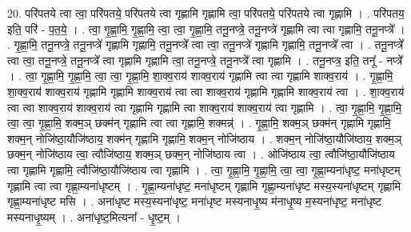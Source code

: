 \documentclass[17pt]{extarticle}
\begin{document}
20. परि॑पतये त्वा त्वा॒ परि॑पतये॒ परि॑पतये त्वा गृह्णामि गृह्णामि त्वा॒ परि॑पतये॒ परि॑पतये त्वा गृह्णामि । . परि॑पतय॒ इति॒ परि॑ - प॒त॒ये॒ । . त्वा॒ गृ॒ह्णा॒मि॒ गृ॒ह्णा॒मि॒ त्वा॒ त्वा॒ गृ॒ह्णा॒मि॒ तनू॒नप्त्रे॒ तनू॒नप्त्रे॑ गृह्णामि त्वा त्वा गृह्णामि॒ तनू॒नप्त्रे᳚ । . गृ॒ह्णा॒मि॒ तनू॒नप्त्रे॒ तनू॒नप्त्रे॑ गृह्णामि गृह्णामि॒ तनू॒नप्त्रे᳚ त्वा त्वा॒ तनू॒नप्त्रे॑ गृह्णामि गृह्णामि॒ तनू॒नप्त्रे᳚ त्वा । . तनू॒नप्त्रे᳚ त्वा त्वा॒ तनू॒नप्त्रे॒ तनू॒नप्त्रे᳚ त्वा गृह्णामि गृह्णामि त्वा॒ तनू॒नप्त्रे॒ तनू॒नप्त्रे᳚ त्वा गृह्णामि । . तनू॒नप्त्र॒ इति॒ तनू᳚ - नप्त्रे᳚ । . त्वा॒ गृ॒ह्णा॒मि॒ गृ॒ह्णा॒मि॒ त्वा॒ त्वा॒ गृ॒ह्णा॒मि॒ शा॒क्व॒राय॑ शाक्व॒राय॑ गृह्णामि त्वा त्वा गृह्णामि शाक्व॒राय॑ । . गृ॒ह्णा॒मि॒ शा॒क्व॒राय॑ शाक्व॒राय॑ गृह्णामि गृह्णामि शाक्व॒राय॑ त्वा त्वा शाक्व॒राय॑ गृह्णामि गृह्णामि शाक्व॒राय॑ त्वा । . शा॒क्व॒राय॑ त्वा त्वा शाक्व॒राय॑ शाक्व॒राय॑ त्वा गृह्णामि गृह्णामि त्वा शाक्व॒राय॑ शाक्व॒राय॑ त्वा गृह्णामि । . त्वा॒ गृ॒ह्णा॒मि॒ गृ॒ह्णा॒मि॒ त्वा॒ त्वा॒ गृ॒ह्णा॒मि॒ शक्म॒ञ् छक्म॑न् गृह्णामि त्वा त्वा गृह्णामि॒ शक्मन्न्॑ । . गृ॒ह्णा॒मि॒ शक्म॒ञ् छक्म॑न् गृह्णामि गृह्णामि॒ शक्म॒न् नोजि॑ष्ठा॒यौजि॑ष्ठाय॒ शक्म॑न् गृह्णामि गृह्णामि॒ शक्म॒न् नोजि॑ष्ठाय । . शक्म॒न् नोजि॑ष्ठा॒यौजि॑ष्ठाय॒ शक्म॒ञ् छक्म॒न् नोजि॑ष्ठाय त्वा॒ त्वौजि॑ष्ठाय॒ शक्म॒ञ् छक्म॒न् नोजि॑ष्ठाय त्वा । . ओजि॑ष्ठाय त्वा॒ त्वौजि॑ष्ठा॒यौजि॑ष्ठाय त्वा गृह्णामि गृह्णामि॒ त्वौजि॑ष्ठा॒यौजि॑ष्ठाय त्वा गृह्णामि । . त्वा॒ गृ॒ह्णा॒मि॒ गृ॒ह्णा॒मि॒ त्वा॒ त्वा॒ गृ॒ह्णा॒म्यना॑धृष्ट॒ मना॑धृष्टम् गृह्णामि त्वा त्वा गृह्णा॒म्यना॑धृष्टम् । . गृ॒ह्णा॒म्यना॑धृष्ट॒ मना॑धृष्टम् गृह्णामि गृह्णा॒म्यना॑धृष्ट मस्य॒स्यना॑धृष्टम् गृह्णामि गृह्णा॒म्यना॑धृष्ट मसि । . अना॑धृष्ट मस्य॒स्यना॑धृष्ट॒ मना॑धृष्ट मस्यनाधृ॒ष्य म॑नाधृ॒ष्य म॒स्यना॑धृष्ट॒ मना॑धृष्ट मस्यनाधृ॒ष्यम् । . अना॑धृष्ट॒मित्यना᳚ - धृ॒ष्ट॒म् । \newline
\end{document}
